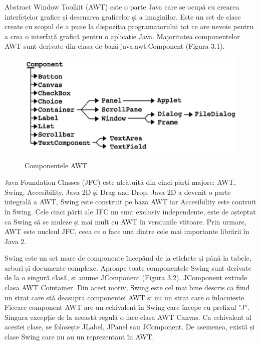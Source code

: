 \documentclass[12pt]{book}
\begin{document}
Abstract Window Toolkit (AWT) este o parte Java care se ocupă cu crearea interfețelor grafice și desenarea graficelor și a imaginilor. Este un set de clase create cu scopul de a pune la dispoziția programatorului tot ce are nevoie pentru a crea o interfață grafică pentru o aplicație Java. Majoritatea componentelor AWT sunt derivate din clasa de bază java.awt.Component (Figura 3.1).

\begin{figure}[!ht]
	\centering
	\includegraphics{awt}
	\caption{Componentele AWT}
	\cite{swingBook}
\end{figure}

Java Foundation Classes (JFC) este alcătuită din cinci părți majore: AWT, Swing, Accesibility, Java 2D și Drag and Drop. Java 2D a devenit o parte integrală a AWT, Swing este construit pe baza AWT iar Accesibility este contruit în Swing. Cele cinci părți ale JFC nu sunt exclusiv independente, este de așteptat ca Swing să se muleze și mai mult cu AWT în versiunile viitoare. Prin urmare, AWT este nucleul JFC, ceea ce o face una dintre cele mai importante librării în Java 2.

Swing este un set mare de componente începând de la etichete și până la tabele, arbori și documente complexe. Aproape toate componentele Swing sunt derivate de la o singură clasă, și anume JComponent (Figura 3.2). JComponent extinde clasa AWT Cointainer. Din acest motiv, Swing este cel mai bine descris ca fiind un strat care stă deasupra componentei AWT și nu un strat care o înlocuiește. Fiecare component AWT are un echivalent în Swing care începe cu prefixul "J". Singura excepție de la această regulă o face clasa AWT Canvas. Ca echivalent al acestei clase, se folosește JLabel, JPanel sau JComponent. De asemenea, există și clase Swing care nu au un reprezentant în AWT.
\end{document}
